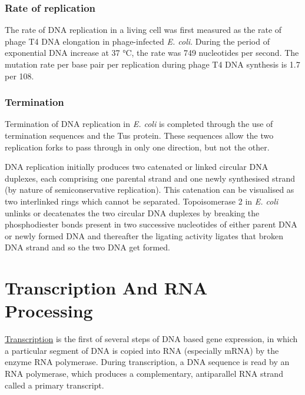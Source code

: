 \hypertarget{rate-of-replication}{%
\subsection{Rate of replication}\label{rate-of-replication}}

The rate of DNA replication in a living cell was first measured as the rate of phage T4 DNA elongation in phage-infected \emph{E. coli}. During the period of exponential DNA increase at 37 °C, the rate was 749 nucleotides per second. The mutation rate per base pair per replication during phage T4 DNA synthesis is 1.7 per 108.

\hypertarget{termination-1}{%
\subsection{Termination}\label{termination-1}}

Termination of DNA replication in \emph{E. coli} is completed through the use of termination sequences and the Tus protein. These sequences allow the two replication forks to pass through in only one direction, but not the other.

DNA replication initially produces two catenated or linked circular DNA duplexes, each comprising one parental strand and one newly synthesised strand (by nature of semiconservative replication). This catenation can be visualised as two interlinked rings which cannot be separated. Topoisomerase 2 in \emph{E. coli} unlinks or decatenates the two circular DNA duplexes by breaking the phosphodiester bonds present in two successive nucleotides of either parent DNA or newly formed DNA and thereafter the ligating activity ligates that broken DNA strand and so the two DNA get formed.

\hypertarget{transcription-and-rna-processing}{%
\chapter{Transcription And RNA Processing}\label{transcription-and-rna-processing}}

\href{https://en.wikipedia.org/wiki/Transcription_(biology)}{Transcription} is the first of several steps of DNA based gene expression, in which a particular segment of DNA is copied into RNA (especially mRNA) by the enzyme RNA polymerase. During transcription, a DNA sequence is read by an RNA polymerase, which produces a complementary, antiparallel RNA strand called a primary transcript.

